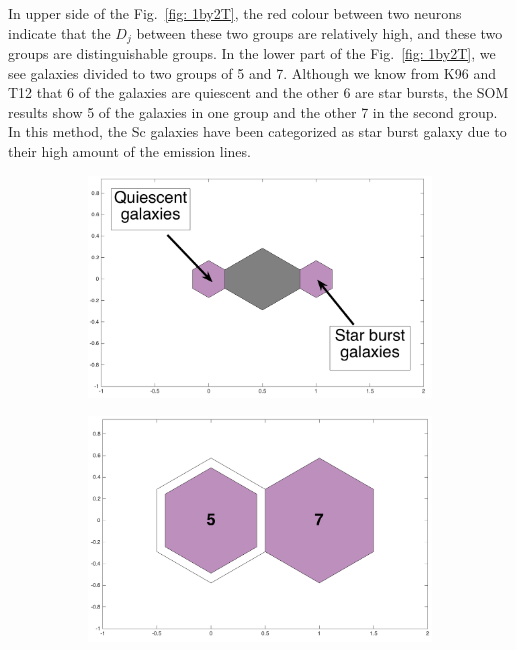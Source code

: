         
            In upper side of the Fig.~\ref{fig: 1by2T}, the red colour between two neurons indicate that the $D_j$ between these two groups are relatively high, and these two groups are distinguishable groups.
            In the lower part of the Fig.~\ref{fig: 1by2T}, we see galaxies divided to two groups of 5 and 7.
            Although we know from K96 and T12 that 6 of the galaxies are quiescent and the other 6 are star bursts, the SOM results show 5 of the galaxies in one group and the other 7 in the second group.
            In this method, the Sc galaxies have been categorized as star burst galaxy due to their high amount of the emission lines.
        

            \begin{figure}
                \begin{subfigure}[b]{0.5\textwidth}
                    \centering
                    \includegraphics[width=\textwidth]{../images0.01/1d/dist_1_by_2.png}
                \end{subfigure}
                \hfill
                \begin{subfigure}[b]{0.5\textwidth}
                     \includegraphics[width=\textwidth]{../images0.01/1d/hit_t_1_by_2.png}

\end{subfigure}
\end{figure}
